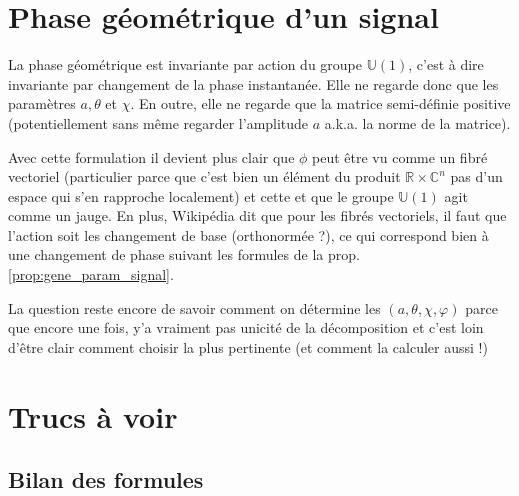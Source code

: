 \documentclass[hidelinks, french, oneside]{article}
\newcommand{\R}{\mathbb{R}}
\newcommand{\C}{\mathbb{C}}
\theoremstyle{enonce}
\theoremstyle{special}
\theoremstyle{rq}
\theoremstyle{exo}
\theoremstyle{demo}
\begin{document}
\setcounter{figure}{0}
\setcounter{lstlisting}{0}

\section{Phase géométrique d'un signal}\label{sec:phasegeo}

La phase géométrique est invariante par action du groupe $\mathbb{U}(1)$, c'est à dire invariante par changement de la phase instantanée. Elle ne regarde donc que les paramètres $a, \theta$ et $\chi$. En outre, elle ne regarde que la matrice semi-définie positive (potentiellement sans même regarder l'amplitude $a$ a.k.a. la norme de la matrice).

Avec cette formulation il devient plus clair que $\phi$ peut être vu comme un fibré vectoriel (particulier parce que c'est bien un élément du produit $\R\times\C^n$ pas d'un espace qui s'en rapproche localement) et cette et que le groupe $\mathbb{U}(1)$ agit comme un jauge. En plus, Wikipédia dit que pour les fibrés vectoriels, il faut que l'action soit les changement de base (orthonormée ?), ce qui correspond bien à une changement de phase suivant les formules de la prop. \ref{prop:gene_param_signal}.

La question reste encore de savoir comment on détermine les $(a,\theta,\chi,\varphi)$ parce que encore une fois, y'a vraiment pas unicité de la décomposition et c'est loin d'être clair comment choisir la plus pertinente (et comment la calculer aussi !)



\section{Trucs à voir}

\subsection{Bilan des formules}
\end{document}
